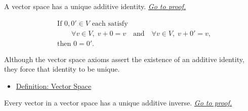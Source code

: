 
\begin{tcolorbox}[colback=thmbox, colframe=thmborder, arc=2pt,
  left=6pt, right=6pt, top=4pt, bottom=4pt,
  title={\small\textbf{Theorem (Unique Additive Identity)}},
  fonttitle=\small\bfseries]
\begin{theorem}
\label{thm:unique-additive-identity}
A vector space has a unique additive identity.
\hyperref[prf:unique-additive-identity]{\textit{Go to proof.}}
\end{theorem}
\end{tcolorbox}

\begin{remark*}
\[
\begin{aligned}
&\text{If } 0,0' \in V \text{ each satisfy} \\
&\qquad \forall v \in V,\; v+0=v
\quad\text{and}\quad
\forall v \in V,\; v+0'=v, \\
&\text{then } 0=0'.
\end{aligned}
\]
\end{remark*}

\begin{remark*}[Interpretation]
Although the vector space axioms assert the existence of an additive identity,
they force that identity to be unique.
\end{remark*}

\begin{remark*}[Dependencies]
\begin{itemize}
  \item \hyperref[def:vector-space]{Definition: Vector Space}
\end{itemize}
\end{remark*}


\begin{tcolorbox}[colback=thmbox, colframe=thmborder, arc=2pt,
  left=6pt, right=6pt, top=4pt, bottom=4pt,
  title={\small\textbf{Theorem (Unique Additive Inverse)}},
  fonttitle=\small\bfseries]
\begin{theorem}
\label{thm:unique-additive-inverse}
Every vector in a vector space has a unique additive inverse.
\hyperref[prf:unique-additive-inverse]{\textit{Go to proof.}}
\end{theorem}
\end{tcolorbox}

